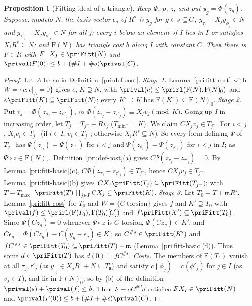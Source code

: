 \documentclass[10pt]{amsart}
\newtheorem{proposition}[theorem]{Proposition}
\theoremstyle{definition}
\theoremstyle{remark}
\begin{document}
\begin{proposition}[Fitting ideal of a triangle]\label{pri:fitt-triangle}
Keep $\Phi$, $p$, $z$, and put $y_g=\Phi(z_g)$. Suppose: modulo $N$, the basis vector $\epsilon_g$
of $R^s$ is $y_g$ for $g\in s\subseteq G$; $y_{\tau_j}-X_jy_{\phi_j}\in N$ and $y_{\tau'_j}-X_j
y_{\phi'_j}\in N$ for all $j$; every $i$ below an element of $I$ lies in $I$ or satisfies $X_iR^s
\subseteq N$; and $\mathrm F(N)$ has triangle cost $b$ along $I$ with constant $C$. Then there is
$F\in R$ with $F\cdot X_I\in\priFitt(N)$ and $\prival(F(0))\le b+(\#I+\#s)\prival(C)$.
\end{proposition}
\begin{proof}
Let $A$ be as in Definition~\ref{pri:def-cost}. \emph{Stage 1.} Lemma~\ref{pri:fitt-cost} with
$W=\{c:c|_A=0\}$ gives $e$, $K\supseteq N$, with $\prival(e)\le\prirl(\mathrm F(N),\mathrm F(N)_0)$
and $e\priFitt(K)\subseteq\priFitt(N)$; every $K'\supseteq K$ has $\mathrm F(K')\subseteq\mathrm
F(N)_0$. \emph{Stage 2.} Put $v_j=\Phi(z_{\phi_j}-z_{\phi'_j})$, so $\Phi(z_{\tau_j}-z_{\tau'_j})
\equiv X_jv_j\pmod K$. Going up $I$ in increasing order, let $T_j=T_{j^-}+Rv_j$ ($T_{\min^-}=K$). We
claim $CX_jv_j\in T_{j^-}$. For $i<j$, $X_iv_i\in T_{j^-}$ (if $i\in I$, $v_i\in T_{j^-}$; otherwise
$X_iR^s\subseteq N$). So every form-defining $\Psi$ of $T_{j^-}$ has $\Psi(z_{\tau_i})=\Psi(
z_{\tau'_i})$ for $i<j$ and $\Psi(z_{\phi_i})=\Psi(z_{\phi'_i})$ for $i<j$ in $I$; as $\Psi\circ z\in
\mathrm F(N)_0$, Definition~\ref{pri:def-cost}(a) gives $C\Psi(z_{\tau_j}-z_{\tau'_j})=0$. By
Lemma~\ref{pri:fitt-basic}(c), $C\Phi(z_{\tau_j}-z_{\tau'_j})\in T_{j^-}$, hence $CX_jv_j\in
T_{j^-}$. Lemma~\ref{pri:fitt-basic}(b) gives $CX_j\priFitt(T_j)\subseteq\priFitt(T_{j^-})$; with
$T=T_{\max}$, $\priFitt(T)\prod_{j\in I}CX_j\subseteq\priFitt(K)$. \emph{Stage 3.} Let $T_0=T+
\mathfrak mR^s$. Lemma~\ref{pri:fitt-cost} for $T_0$ and $W=\{C\text{-torsion}\}$ gives $f$ and
$K'\supseteq T_0$ with $\prival(f)\le\prirl(\mathrm F(T_0),\mathrm F(T_0)[C])$ and $f\priFitt(K')
\subseteq\priFitt(T_0)$. Since $\Psi(Cz_g)=0$ whenever $\Psi\circ z$ is $C$-torsion, $\Phi(Cz_g)\in
K'$, and $C\epsilon_g=\Phi(Cz_g)-C(y_g-\epsilon_g)\in K'$; so $C^{\#s}\in\priFitt(K')$ and $fC^{\#s}\in
\priFitt(T_0)\subseteq\priFitt(T)+\mathfrak m$ (Lemma~\ref{pri:fitt-basic}(d)). Thus some $d\in
\priFitt(T)$ has $d(0)=fC^{\#s}$. \emph{Costs.} The members of $\mathrm F(T_0)$ vanish at all
$\tau_j,\tau'_j$ (as $y_{\tau_j}\in X_jR^s+N\subseteq T_0$) and satisfy $c(\phi_j)=c(\phi'_j)$ for
$j\in I$ (as $v_j\in T$), and lie in $\mathrm F(N)_0$; so by (b) of the definition $\prival(e)+
\prival(f)\le b$. Then $F=eC^{\#I}d$ satisfies $FX_I\in\priFitt(N)$ and $\prival(F(0))\le b+
(\#I+\#s)\prival(C)$.
\end{proof}
\end{document}
